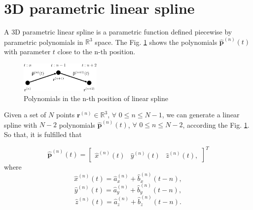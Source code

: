 \section{3D parametric linear spline }
A 3D parametric linear spline is a parametric function defined piecewise by parametric polynomials in $\mathbb{R}^{3}$ space.
The Fig. \ref{fig:3DLinearSplinePoly} shows the polynomials $\mathbf{\hat{p}}^{(n)}(t)$ with parameter $t$ 
close to the n-th position.
\begin{figure}[H]
    \centering
    \includegraphics[width=0.35\textwidth]{boveda/Diagrama0.eps}
    \caption{Polynomials in the n-th position of linear spline}
    \label{fig:3DLinearSplinePoly}
\end{figure}

Given a set of $N$ points $\mathbf{r}^{(n)}\in\mathbb{R}^{3}$, $\forall$ $0\leq n \leq N-1$, 
we can generate a linear spline with $N-2$ polynomials $\mathbf{\hat{p}}^{(n)}(t)$, $\forall$ $0\leq n \leq N-2$, 
according the Fig. \ref{fig:3DLinearSplinePoly}.
So that, it is fulfilled that 

\begin{equation}
\mathbf{\hat{p}}^{(n)}(t)=
\begin{bmatrix}
\hat{x}^{(n)}(t) & \hat{y}^{(n)}(t) & \hat{z}^{(n)}(t),
\end{bmatrix}^{T}
\end{equation}
where
\begin{equation}
\hat{x}^{(n)}(t)=\hat{a}_{x}^{(n)}+\hat{b}_{x}^{(n)}(t-n),
\end{equation}
\begin{equation}
\hat{y}^{(n)}(t)=\hat{a}_{y}^{(n)}+\hat{b}_{y}^{(n)}(t-n),
\end{equation}
\begin{equation}
\hat{z}^{(n)}(t)=\hat{a}_{z}^{(n)}+\hat{b}_{z}^{(n)}(t-n).
\end{equation}



